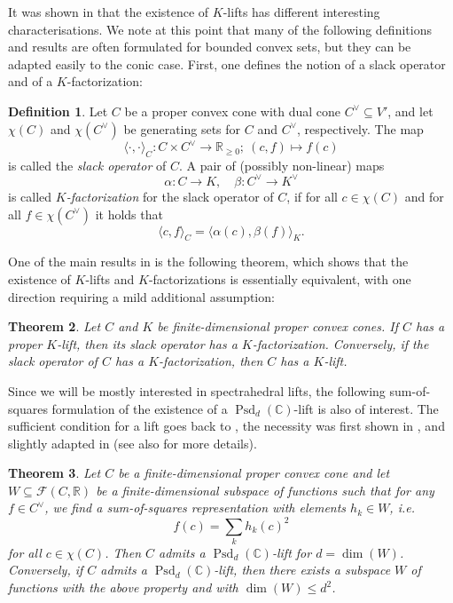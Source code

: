 \documentclass[11pt,onecolumn]{article}
\theoremstyle{plain}
\newtheorem{theorem}{Theorem}[section]
\theoremstyle{definition}
\newtheorem{definition}[theorem]{Definition}
\newcommand{\R}{\mathbb{R}}
\begin{document}
It was shown in \cite{GPT} that the existence of \(K\)-lifts has different interesting characterisations. We note at this point that many of the following definitions and results are often formulated for bounded convex sets, but they can be  adapted easily to the  conic case.
First, one defines the notion of a slack operator and of a \(K\)-factorization:

\begin{definition}
	Let \(C\) be a proper convex cone with dual cone \(C^\lor\subseteq V'\), and let \(\chi(C)\) and \(\chi(C^\lor)\) be generating sets for \(C\) and \(C^\lor\), respectively. 
	The map \[\langle\cdot,\cdot\rangle_C\colon C \times C^\vee\to \R_{\geqslant 0};\ (c,f)\mapsto f(c)\] is called the \textit{slack operator} of \(C\).
	A pair of (possibly non-linear) maps \[\alpha\colon C \to K, \quad \beta\colon C^\lor \to K^\lor\] is called \(K\)\textit{-factorization} for the slack operator of $C$, if for all \(c \in \chi(C)\) and for all \(f \in \chi(C^\lor)\) it holds that $$\langle c,f\rangle_C = \langle \alpha(c),\beta(f)\rangle_K.$$
\end{definition}

One of the main results in \cite{GPT} is the following theorem, which shows that the existence of \(K\)-lifts and \(K\)-factorizations is essentially equivalent, with one direction requiring a mild additional assumption:

\begin{theorem} \label{thm:lift_iff_fact}
	Let \(C\) and \(K\) be finite-dimensional proper convex cones. If \(C\) has a proper \(K\)-lift, then its slack operator has a \(K\)-factorization. Conversely, if the slack operator of $C$ has a \(K\)-factorization, then \(C\) has a \(K\)-lift.
\end{theorem}

Since we will be mostly interested in spectrahedral lifts, the following sum-of-squares formulation of the existence of a \(\operatorname{Psd}_d(\mathbb C)\)-lift  is also of interest. The sufficient condition for a lift goes back to \cite{las}, the necessity was first shown in \cite{schei}, and slightly adapted in \cite{faw} (see also \cite{fgpst, nepl} for more details). 

\begin{theorem} \label{thm:lift_iff_SOS}
	Let \(C\) be a finite-dimensional proper convex cone and let \(W \subseteq \mathcal{F}(C, \R)\) be a finite-dimensional subspace of functions such that for any \(f \in C^\lor\), we find a sum-of-squares representation with elements \(h_k \in W\), i.e. \[f(c) = \sum_k h_k(c)^2\] for all \(c \in \chi(C)\). Then \(C\) admits a \(\operatorname{Psd}_d(\mathbb C)\)-lift for \(d = \operatorname{dim}(W)\). Conversely, if \(C\) admits a \(\operatorname{Psd}_d(\mathbb C)\)-lift, then there exists a subspace \(W\) of functions with the above property and with \(\operatorname{dim}(W) \leqslant d^2\).
\end{theorem}
\end{document}
